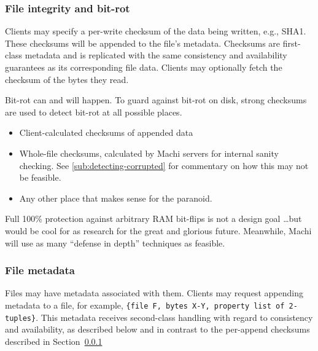 \documentclass[preprint,10pt]{sigplanconf}
\begin{document}
\subsubsection{File integrity and bit-rot}
\label{sub:bit-rot}

Clients may specify a per-write checksum of the data being written,
e.g., SHA1.  These checksums will be appended to the file's
metadata.  Checksums are first-class metadata and is replicated with
the same consistency and availability guarantees as its corresponding
file data.
Clients may optionally fetch the checksum of the bytes they
read.

Bit-rot can and will happen.  To guard against bit-rot on disk, strong
  checksums are used to detect bit-rot at all possible places.
\begin{itemize}
    \item Client-calculated checksums of appended data
    \item Whole-file checksums, calculated by Machi servers for internal
      sanity checking.  See \ref{sub:detecting-corrupted} for
      commentary on how this may not be feasible.
    \item Any other place that makes sense for the paranoid.
\end{itemize}

Full 100\% protection against arbitrary RAM bit-flips is not a design
goal \ldots but would be cool for as research for the great and
glorious future.  Meanwhile, Machi will use as many ``defense in
depth'' techniques as feasible.

\subsubsection{File metadata}

Files may have metadata associated with them.
Clients may request appending metadata to a file, for example,
  {\tt \{file F, bytes X-Y, property list of 2-tuples\}}.
This metadata receives second-class handling with regard to
consistency and availability, as described below and in contrast to
the per-append checksums described in Section~\ref{sub:bit-rot}
\end{document}
